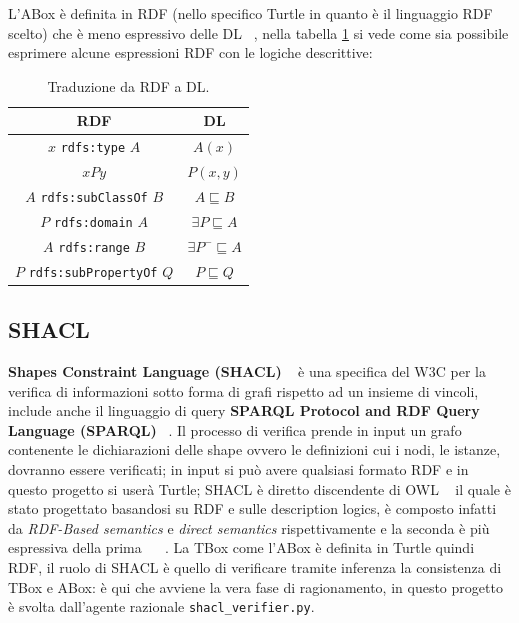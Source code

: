 \documentclass{article}
\begin{document}
L'ABox è definita in RDF (nello specifico Turtle in quanto è il linguaggio RDF scelto) che è meno espressivo delle DL ~\cite[Logic for the semantic web, 2.4]{logic:computational}, nella tabella \ref{tab:DL_RDF} si vede come sia possibile esprimere alcune espressioni RDF con le logiche descrittive: 

\begin{table}[h!t]
    \centering
    \caption{Traduzione da RDF a DL.}
    \label{tab:DL_RDF}
    \begin{tabular}{c c}
        \hline 
        \textbf{RDF} & \textbf{DL} \\
        \hline
        $ x $ \texttt{rdfs:type} $ A $ & $ A(x) $ \\
        $ x P y $ & $ P(x,y) $ \\
        $ A $ \texttt{rdfs:subClassOf} $ B $ & $ A \sqsubseteq B $ \\
        $ P $ \texttt{rdfs:domain} $ A $ & $ \exists P \sqsubseteq A $ \\
        $ A $ \texttt{rdfs:range} $ B $ & $ \exists P^{-} \sqsubseteq A $ \\
        $ P $ \texttt{rdfs:subPropertyOf} $ Q $ & $ P \sqsubseteq Q $ \\
        \hline
    \end{tabular}
\end{table}

\subsection{SHACL} \label{sec:shacl}
\textbf{Shapes Constraint Language (SHACL)} ~\cite{shacl} è una specifica del W3C per la verifica di informazioni sotto forma di grafi rispetto ad un insieme di vincoli, include anche il linguaggio di query \textbf{SPARQL Protocol and RDF Query Language (SPARQL)} ~\cite{sparql}.
Il processo di verifica prende in input un grafo contenente le dichiarazioni delle shape ovvero le definizioni cui i nodi, le istanze, dovranno essere verificati; in input si può avere qualsiasi formato RDF e in questo progetto si userà Turtle; SHACL è diretto discendente di OWL ~\cite{shacl:owl} il quale è stato progettato basandosi su RDF e sulle description logics, è composto infatti da \textit{RDF-Based semantics} e \textit{direct semantics} rispettivamente e la seconda è più espressiva della prima ~\cite[7]{rdf:semantics} ~\cite[Logic for the semantic web, 3.2]{logic:computational}. La TBox come l'ABox è definita in Turtle quindi RDF, il ruolo di SHACL è quello di verificare tramite inferenza la consistenza di TBox e ABox: è qui che avviene la vera fase di ragionamento, in questo progetto è svolta dall'agente razionale \texttt{shacl\_verifier.py}.
\end{document}
